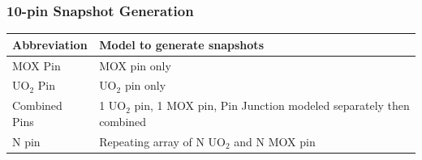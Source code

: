 \documentclass[fleqn]{beamer}
\begin{document}
  \begin{frame}
    \frametitle{10-pin Snapshot Generation}
    \begin{table}
      \begin{tabular}{l | p{7cm}}\toprule
	Abbreviation    & Model to generate snapshots \\
	\hline
	MOX Pin         & MOX pin only \\
	UO$_2$ Pin      & UO$_2$ pin only \\
	Combined Pins  & 1 UO$_2$ pin, 1 MOX pin, Pin Junction modeled separately then combined \\
	N pin           & Repeating array of N UO$_2$ and N MOX pin \\
	\bottomrule
      \end{tabular}
      \label{tab:snapshots}
    \end{table}
  \end{frame}



\end{document}

